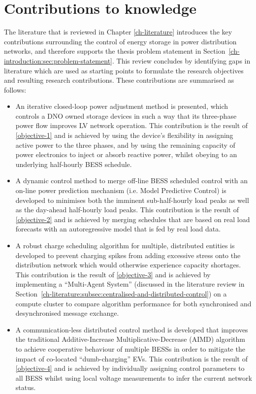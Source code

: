 \section{Contributions to knowledge}
\label{ch-introduction:sec:contributions}

The literature that is reviewed in Chapter \ref{ch-literature} introduces the key contributions surrounding the control of energy storage in power distribution networks, and therefore supports the thesis problem statement in Section~\ref{ch-introduction:sec:problem-statement}.
This review concludes by identifying gaps in literature which are used as starting points to formulate the research objectives and resulting research contributions.
These contributions are summarised as follows:

\begin{itemize}
	\item
	An iterative closed-loop power adjustment method is presented, which controls a DNO owned storage devices in such a way that its three-phase power flow improves LV network operation.
	This contribution is the result of \ref{objective-1} and is achieved by using the device's flexibility in assigning active power to the three phases, and by using the remaining capacity of power electronics to inject or absorb reactive power, whilst obeying to an underlying half-hourly BESS schedule.
	\item
	A dynamic control method to merge off-line BESS scheduled control with an on-line power prediction mechanism (i.e. Model Predictive Control) is developed to minimises both the imminent sub-half-hourly load peaks as well as the day-ahead half-hourly load peaks.
	This contribution is the result of \ref{objective-2} and is achieved by merging schedules that are based on real load forecasts with an autoregressive model that is fed by real load data.
	\item
	A robust charge scheduling algorithm for multiple, distributed entities is developed to prevent charging spikes from adding excessive stress onto the distribution network which would otherwise experience capacity shortages.
	This contribution is the result of \ref{objective-3} and is achieved by implementing a ``Multi-Agent System'' (discussed in the literature review in Section~\ref{ch-literature:subsec:centralised-and-distributed-control}) on a compute cluster to compare algorithm performance for both synchronised and desynchronised message exchange.
	\item
	A communication-less distributed control method is developed that improves the traditional Additive-Increase Multiplicative-Decrease (AIMD) algorithm to achieve cooperative behaviour of multiple BESSs in order to mitigate the impact of co-located ``dumb-charging'' EVs.
	This contribution is the result of \ref{objective-4} and is achieved by individually assigning control parameters to all BESS whilst using local voltage measurements to infer the current network status.
\end{itemize}
